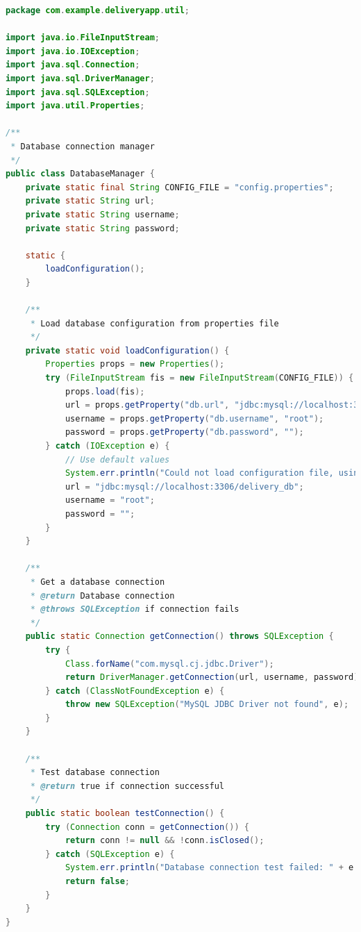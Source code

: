 \documentclass{rapportENSIAS}
\begin{document}
\begin{lstlisting}[language=Java, caption=Gestionnaire de base de donn\'{e}es]
package com.example.deliveryapp.util;

import java.io.FileInputStream;
import java.io.IOException;
import java.sql.Connection;
import java.sql.DriverManager;
import java.sql.SQLException;
import java.util.Properties;

/**
 * Database connection manager
 */
public class DatabaseManager {
    private static final String CONFIG_FILE = "config.properties";
    private static String url;
    private static String username;
    private static String password;
    
    static {
        loadConfiguration();
    }
    
    /**
     * Load database configuration from properties file
     */
    private static void loadConfiguration() {
        Properties props = new Properties();
        try (FileInputStream fis = new FileInputStream(CONFIG_FILE)) {
            props.load(fis);
            url = props.getProperty("db.url", "jdbc:mysql://localhost:3306/delivery_db");
            username = props.getProperty("db.username", "root");
            password = props.getProperty("db.password", "");
        } catch (IOException e) {
            // Use default values
            System.err.println("Could not load configuration file, using defaults: " + e.getMessage());
            url = "jdbc:mysql://localhost:3306/delivery_db";
            username = "root";
            password = "";
        }
    }
    
    /**
     * Get a database connection
     * @return Database connection
     * @throws SQLException if connection fails
     */
    public static Connection getConnection() throws SQLException {
        try {
            Class.forName("com.mysql.cj.jdbc.Driver");
            return DriverManager.getConnection(url, username, password);
        } catch (ClassNotFoundException e) {
            throw new SQLException("MySQL JDBC Driver not found", e);
        }
    }
    
    /**
     * Test database connection
     * @return true if connection successful
     */
    public static boolean testConnection() {
        try (Connection conn = getConnection()) {
            return conn != null && !conn.isClosed();
        } catch (SQLException e) {
            System.err.println("Database connection test failed: " + e.getMessage());
            return false;
        }
    }
}
\end{lstlisting}
\end{document}
